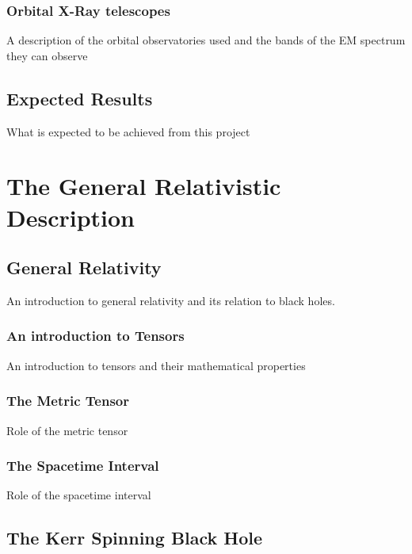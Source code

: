 \documentclass[12pt, oneside]{smuthesis}
\begin{document}
\subsection{\sc Orbital X-Ray telescopes} \label{xrayTelesopes}

A description of the orbital observatories used and the bands of the EM spectrum they can observe

\newpage

\section{\sc Expected Results} \label{expectedResults}

What is expected to be achieved from this project

\newpage

\chapter{\sc The General Relativistic Description} \label{GRDescription}

\section{\sc General Relativity} \label{generalRelativity}

An introduction to general relativity and its relation to black holes.

\subsection{\sc An introduction to Tensors} \label{tensorIntro}

An introduction to tensors and their mathematical properties

\subsection{\sc The Metric Tensor} \label{metricTensor}

Role of the metric tensor

\subsection{\sc The Spacetime Interval} \label{spacetimeInterval}

Role of the spacetime interval

\section{\sc The Kerr Spinning Black Hole} \label{kerrSpinningBH}
\end{document}
